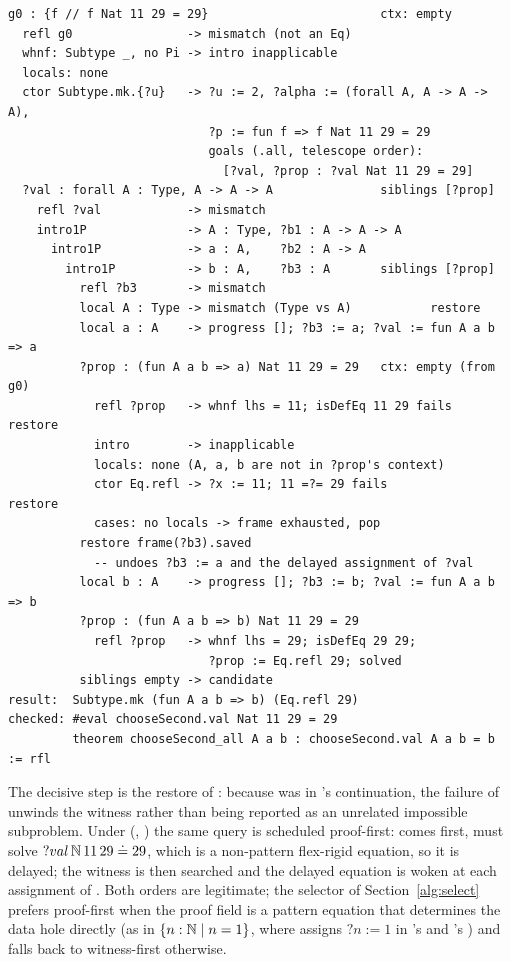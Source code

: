 \begin{lstlisting}
g0 : {f // f Nat 11 29 = 29}                        ctx: empty
  refl g0                -> mismatch (not an Eq)
  whnf: Subtype _, no Pi -> intro inapplicable
  locals: none
  ctor Subtype.mk.{?u}   -> ?u := 2, ?alpha := (forall A, A -> A -> A),
                            ?p := fun f => f Nat 11 29 = 29
                            goals (.all, telescope order):
                              [?val, ?prop : ?val Nat 11 29 = 29]
  ?val : forall A : Type, A -> A -> A               siblings [?prop]
    refl ?val            -> mismatch
    intro1P              -> A : Type, ?b1 : A -> A -> A
      intro1P            -> a : A,    ?b2 : A -> A
        intro1P          -> b : A,    ?b3 : A       siblings [?prop]
          refl ?b3       -> mismatch
          local A : Type -> mismatch (Type vs A)           restore
          local a : A    -> progress []; ?b3 := a; ?val := fun A a b => a
          ?prop : (fun A a b => a) Nat 11 29 = 29   ctx: empty (from g0)
            refl ?prop   -> whnf lhs = 11; isDefEq 11 29 fails   restore
            intro        -> inapplicable
            locals: none (A, a, b are not in ?prop's context)
            ctor Eq.refl -> ?x := 11; 11 =?= 29 fails            restore
            cases: no locals -> frame exhausted, pop
          restore frame(?b3).saved
            -- undoes ?b3 := a and the delayed assignment of ?val
          local b : A    -> progress []; ?b3 := b; ?val := fun A a b => b
          ?prop : (fun A a b => b) Nat 11 29 = 29
            refl ?prop   -> whnf lhs = 29; isDefEq 29 29;
                            ?prop := Eq.refl 29; solved
          siblings empty -> candidate
result:  Subtype.mk (fun A a b => b) (Eq.refl 29)
checked: #eval chooseSecond.val Nat 11 29 = 29
         theorem chooseSecond_all A a b : chooseSecond.val A a b = b := rfl
\end{lstlisting}

The decisive step is the restore of : because  was in 's continuation, the failure of  unwinds the witness rather than being reported as an unrelated impossible subproblem. Under  (, ) the same query is scheduled proof-first:  comes first,  must solve $?val\,\mathbb{N}\,11\,29 \doteq 29$, which is a non-pattern flex-rigid equation, so it is delayed; the witness is then searched and the delayed equation is woken at each assignment of . Both orders are legitimate; the selector of Section~\ref{alg:select} prefers proof-first when the proof field is a pattern equation that determines the data hole directly (as in $\{n:\mathbb{N} \mid n = 1\}$, where  assigns $?n := 1$ in 's  and 's ) and falls back to witness-first otherwise.

